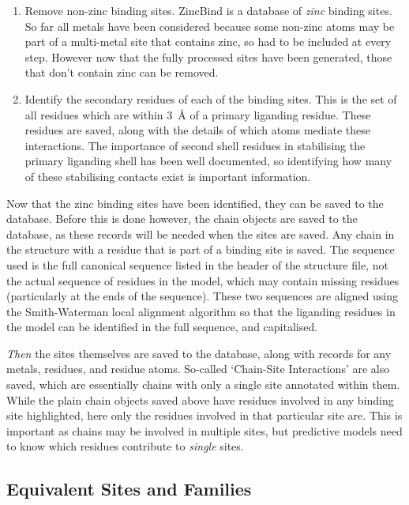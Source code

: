 \begin{enumerate}
   \item Remove non-zinc binding sites. ZincBind is a database of \emph{zinc} binding sites. So far all metals have been considered because some non-zinc atoms may be part of a multi-metal site that contains zinc, so had to be included at every step. However now that the fully processed sites have been generated, those that don't contain zinc can be removed.
   \item Identify the secondary residues of each of the binding sites. This is the set of all residues which are within 3~{\AA} of a primary liganding residue. These residues are saved, along with the details of which atoms mediate these interactions. The importance of second shell residues in stabilising the primary liganding shell has been well documented, so identifying how many of these stabilising contacts exist is important information.
\end{enumerate}

Now that the zinc binding sites have been identified, they can be saved to the database. Before this is done however, the chain objects are saved to the database, as these records will be needed when the sites are saved. Any chain in the structure with a residue that is part of a binding site is saved. The sequence used is the full canonical sequence listed in the header of the structure file, not the actual sequence of residues in the model, which may contain missing residues (particularly at the ends of the sequence). These two sequences are aligned using the Smith-Waterman local alignment algorithm \cite{smith1981alignment} so that the liganding residues in the model can be identified in the full sequence, and capitalised.

\emph{Then} the sites themselves are saved to the database, along with records for any metals, residues, and residue atoms. So-called `Chain-Site Interactions' are also saved, which are essentially chains with only a single site annotated within them. While the plain chain objects saved above have residues involved in any binding site highlighted, here only the residues involved in that particular site are. This is important as chains may be involved in multiple sites, but predictive models need to know which residues contribute to \emph{single} sites.

\subsection{Equivalent Sites and Families}

